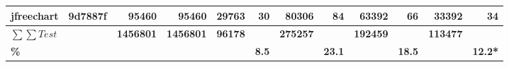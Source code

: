 \begin{landscape}
\begin{table*}[htbp]
{\begin{tabular}{|l|r|r|r|r|r|r|r|r|r|r|r|}
\multicolumn{1}{|l|}{jfreechart}&	9d7887f	&95460	&95460	&29763	&30	&80306	&84	&63392	&66	&33392	&34 \\
    \hline
    \multicolumn{1}{|l|}{\textbf{$\sum \sum Test$}} &  \multicolumn{1}{r|}{ \textbf{} }   & \textbf{1456801} &\multicolumn{1}{|r|}{\textbf{1456801}}&  \multicolumn{1}{|l|}{\textbf{96178}}     &  &  \textbf{275257 }    &  &  \textbf{192459}     & & \textbf{113477}  &   \\
        \hline
   \multicolumn{1}{|l|}{ \textbf{\%}} &       &       &  &       & \multicolumn{1}{|r|}{\textbf{8.5}} &       & \textbf{23.1} &       & \textbf{18.5} &  & \textbf{12.2*} \\
    
    
    \hline
    
    \end{tabular}%
    }
  \label{table:rq1}%
\end{table*}

\end{landscape}




